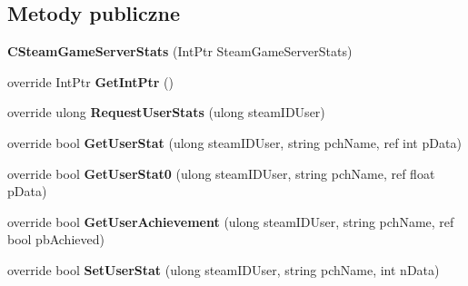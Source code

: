 \subsection*{Metody publiczne}
\begin{DoxyCompactItemize}
\item 
\mbox{\label{class_valve_1_1_steamworks_1_1_c_steam_game_server_stats_aad5ac1457963d0e184cab80ad55b4273}} 
{\bfseries C\+Steam\+Game\+Server\+Stats} (Int\+Ptr Steam\+Game\+Server\+Stats)
\item 
\mbox{\label{class_valve_1_1_steamworks_1_1_c_steam_game_server_stats_a453c1afef643d8914f41c4e86603a1f2}} 
override Int\+Ptr {\bfseries Get\+Int\+Ptr} ()
\item 
\mbox{\label{class_valve_1_1_steamworks_1_1_c_steam_game_server_stats_af71a39cd95e5dc12170e61698192a9cd}} 
override ulong {\bfseries Request\+User\+Stats} (ulong steam\+I\+D\+User)
\item 
\mbox{\label{class_valve_1_1_steamworks_1_1_c_steam_game_server_stats_a94233f56bfd2d841e67f54def4ac93ec}} 
override bool {\bfseries Get\+User\+Stat} (ulong steam\+I\+D\+User, string pch\+Name, ref int p\+Data)
\item 
\mbox{\label{class_valve_1_1_steamworks_1_1_c_steam_game_server_stats_a517475fc719ffdac567ec178280e693e}} 
override bool {\bfseries Get\+User\+Stat0} (ulong steam\+I\+D\+User, string pch\+Name, ref float p\+Data)
\item 
\mbox{\label{class_valve_1_1_steamworks_1_1_c_steam_game_server_stats_a653fc79c9a639912efb0b320e77005f4}} 
override bool {\bfseries Get\+User\+Achievement} (ulong steam\+I\+D\+User, string pch\+Name, ref bool pb\+Achieved)
\item 
\mbox{\label{class_valve_1_1_steamworks_1_1_c_steam_game_server_stats_a09249b441e9bb48acb290f1c858a0a19}} 
override bool {\bfseries Set\+User\+Stat} (ulong steam\+I\+D\+User, string pch\+Name, int n\+Data)

\end{DoxyCompactItemize}
